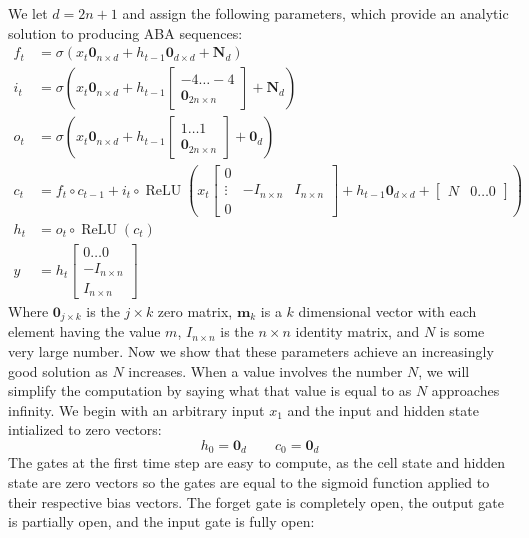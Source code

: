 \documentclass{article}
\DeclareMathOperator{\ReLU}{ReLU}
\begin{document}
We let $d = 2n + 1$ and assign the following parameters, which provide an analytic solution to producing ABA sequences:
%
\begin{align*}
  f_t &= \sigma(x_t \textbf{0}_{n\times d} + h_{t-1}\textbf{0}_{d \times d} + \textbf{N}_{d}) \\
  i_t &= \sigma(x_t\textbf{0}_{n\times d} + h_{t-1}\begin{bmatrix} -4 \dots -4 \\ \textbf{0}_{2n\times n} \end{bmatrix}  + \textbf{N}_d)   \\
  o_t &= \sigma(x_t\textbf{0}_{n\times d} +  h_{t-1} \begin{bmatrix} 1 \dots 1 \\ \textbf{0}_{2n\times n} \end{bmatrix} + \textbf{0}_{d})\\
  c_t &= f_t \circ c_{t-1} + i_t \circ \ReLU\left(x_t \begin{bmatrix} 0 &  & \\ \vdots & -I_{n \times n} & I_{n \times n}\\ 0 & &  \end{bmatrix} + h_{t-1}\textbf{0}_{d \times d} + \begin{bmatrix} N & 0 \dots 0\end{bmatrix}\right) \\
  h_t &= o_t \circ \ReLU(c_t)\\
  y &= h_t \begin{bmatrix} 0 \dots 0 \\ -I_{n \times n} \\ I_{n \times n}  \end{bmatrix}
\end{align*}
%
Where $\textbf{0}_{j\times k}$ is the $j \times k$ zero matrix, $\textbf{m}_k$ is a $k$ dimensional vector with each element having the value $m$, $I_{n\times n}$ is the $n \times n$ identity matrix, and $N$ is some very large number.  Now we show that these parameters achieve an increasingly good solution as $N$ increases. When a value involves the number $N$, we will simplify the computation by saying what that value is equal to as $N$ approaches infinity. We begin with an arbitrary input $x_1$ and the input and hidden state intialized to zero vectors:
%
\[
  h_0 = \textbf{0}_d \qquad c_0 = \textbf{0}_d
\]
%
The gates at the first time step are easy to compute, as the cell state and hidden state are zero vectors so the gates are equal to the sigmoid function applied to their respective bias vectors. The forget gate is completely open, the output gate is partially open, and the input gate is fully open:
\end{document}
